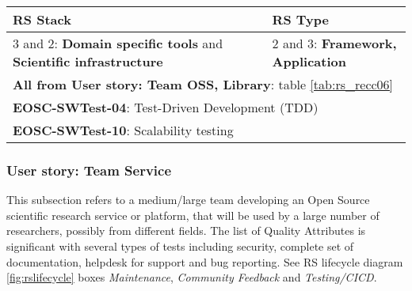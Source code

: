 \begin{center}
  \label{tab:rs_recc07}
  \small
  \begin{tabular}{|p{0.65\linewidth}|p{0.35\linewidth}|} \hline

    \textbf{RS Stack} & \textbf{RS Type} \\ \hline \hline
    3 and 2: \textbf{Domain specific tools} and  \textbf{Scientific infrastructure} &
    2 and 3: \textbf{Framework, Application} \\ \hline \hline
    \multicolumn{2}{|l|}{\textbf{All from User story: Team OSS, Library}: table \ref{tab:rs_recc06}} \\ \hline
    \multicolumn{2}{|l|}{\textbf{EOSC-SWTest-04}: Test-Driven Development (TDD)} \\ \hline
    \multicolumn{2}{|l|}{\textbf{EOSC-SWTest-10}: Scalability testing} \\ \hline

  \end{tabular}
\end{center}

\subsubsection{User story: Team Service}

This subsection refers to a medium/large team developing an Open Source scientific research service or platform, that will be used by a large number of researchers, possibly from different fields. The list of Quality Attributes is significant with several types of tests including security, complete set of documentation, helpdesk for support and bug reporting. See RS lifecycle diagram \ref{fig:rslifecycle} boxes \textit{Maintenance}, \textit{Community Feedback} and \textit{Testing/CICD}.

